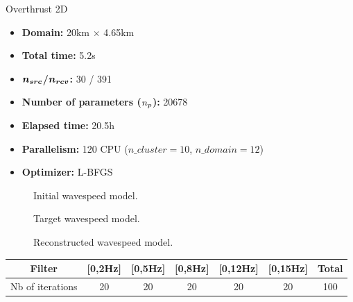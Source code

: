 \begin{frame}{Overthrust 2D}

  \vspace{-0.6cm}
   \begin{multicols}{2}

     \begin{itemize}
       \scriptsize
    \item \textbf{Domain:} 20km $\times$ 4.65km
    \item \textbf{Total time:} 5.2s
    \item \textbf{$\boldsymbol{{n_{src}}}$/$\boldsymbol{{n_{rcv}}}$:} 30 / 391
    \item \textbf{Number of parameters (${n_{p}}$):} 20678
    \item \textbf{Elapsed time:} 20.5h
    \item \textbf{Parallelism:} 120 CPU ($n\_cluster=10$, $n\_domain=12$)
    \item \textbf{Optimizer:} L-BFGS
     \end{itemize}

     \columnbreak
     \scriptsize
     \setlength{\modelwidth}{6.0cm}
     \begin{figure}
       \renewcommand{\modelfile}{image/mesh_adapt/overthrust_ini_paraview}
       
       \vspace{-0.3cm}
       \caption*{\scriptsize{Initial wavespeed model.}}
       \label{marmousi_blind_c4}
     \end{figure}
     \vspace{-1.2cm}
     \begin{figure}
       \renewcommand{\modelfile}{image/mesh_adapt/overthrust}
       
       \vspace{-0.3cm}
       \caption*{\scriptsize{Target wavespeed model.}}
       \label{marmousi_blind_c4}
     \end{figure}
     \vspace{-1.2cm}
          \begin{figure}
       \renewcommand{\modelfile}{image/overthrust_final_p2}
       
       \vspace{-0.3cm}
       \caption*{\scriptsize{Reconstructed wavespeed model.}}
       \label{marmousi_blind_c4}
     \end{figure}


   \end{multicols}

   \vspace{-1cm}
   \begin{table}[H]
     \scriptsize
  \centering
\begin{tabular}{|c|c|c|c|c|c|c|}
\hline
Filter          & {[}0,2Hz{]} & {[}0,5Hz{]} & {[}0,8Hz{]} & {[}0,12Hz{]}& {[}0,15Hz{]}  & Total \\ \hline
Nb of iterations& 20          & 20          & 20          & 20          &    20         & 100   \\ \hline
\end{tabular}
\label{freq_overthrust}
\end{table}

\end{frame}



